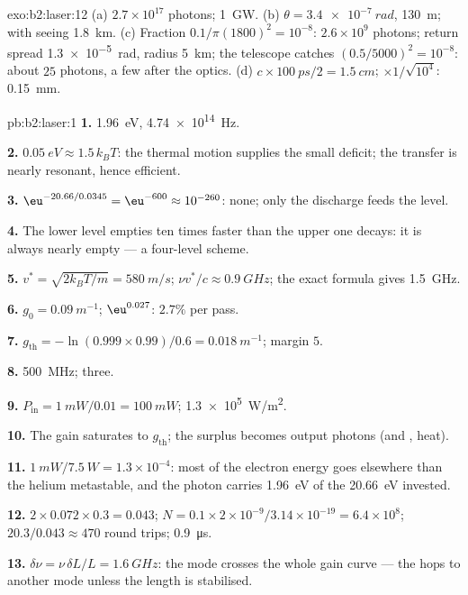 \begin{solution}{exo:b2:laser:12}
(a) $2.7 \times 10^{17}$ photons; \qty{1}{GW}. (b) $\theta = \qty{3.4e-7}{rad}$,
\qty{130}{m}; with seeing \qty{1.8}{km}. (c) Fraction $0.1/\pi(1800)^2 =
10^{-8}$: $2.6 \times 10^9$ photons; return spread \qty{1.3e-5}{rad}, radius
\qty{5}{km}; the telescope catches $(0.5/5000)^2 = 10^{-8}$: about $25$
photons, a few after the optics. (d) $c \times \qty{100}{ps}/2 = \qty{1.5}{cm}$;
$\times 1/\sqrt{10^4}$: \qty{0.15}{mm}.
\end{solution}

\begin{solution}{pb:b2:laser:1}
\textbf{1.} \qty{1.96}{eV}, \qty{4.74e14}{Hz}.

\textbf{2.} $\qty{0.05}{eV} \approx 1.5\,k_BT$: the thermal motion supplies
the small deficit; the transfer is nearly resonant, hence efficient.

\textbf{3.} $\eu^{-20.66/0.0345} = \eu^{-600} \approx 10^{-260}$: none; only the
discharge feeds the level.

\textbf{4.} The lower level empties ten times faster than the upper
one decays: it is always nearly empty --- a four-level scheme.

\textbf{5.} $v^* = \sqrt{2k_BT/m} = \qty{580}{m/s}$; $\nu v^*/c \approx \qty{0.9}{GHz}$;
the exact formula gives \qty{1.5}{GHz}.

\textbf{6.} $g_0 = \qty{0.09}{m^{-1}}$; $\eu^{0.027}$: $2.7\%$ per pass.

\textbf{7.} $g_{\text{th}} = -\ln(0.999 \times 0.99)/0.6 = \qty{0.018}{m^{-1}}$;
margin $5$.

\textbf{8.} \qty{500}{MHz}; three.

\textbf{9.} $P_{\text{in}} = \qty{1}{mW}/0.01 = \qty{100}{mW}$; \qty{1.3e5}{W/m^2}.

\textbf{10.} The gain saturates to $g_{\text{th}}$; the surplus becomes
output photons (and , heat).

\textbf{11.} $\qty{1}{mW}/\qty{7.5}{W} = 1.3 \times 10^{-4}$: most of the
electron energy goes elsewhere than the helium metastable, and the
photon carries \qty{1.96}{eV} of the \qty{20.66}{eV} invested.

\textbf{12.} $2 \times 0.072 \times 0.3 = 0.043$; $N = 0.1 \times 2 \times 10^{-9}/3.14
\times 10^{-19} = 6.4 \times 10^8$; $20.3/0.043 \approx 470$ round trips;
\qty{0.9}{\micro s}.

\textbf{13.} $\delta\nu = \nu\,\delta L/L = \qty{1.6}{GHz}$: the mode crosses the
whole gain curve --- the  hops to another mode unless the length is
stabilised.


\end{solution}
